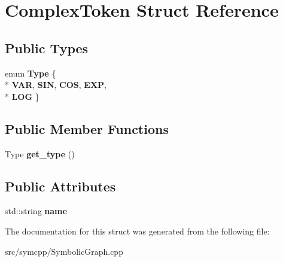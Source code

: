 \hypertarget{structComplexToken}{}\section{Complex\+Token Struct Reference}
\label{structComplexToken}
\subsection*{Public Types}
\begin{DoxyCompactItemize}
\item 
enum {\bfseries Type} \{ \\*
{\bfseries V\+AR}, 
{\bfseries S\+IN}, 
{\bfseries C\+OS}, 
{\bfseries E\+XP}, 
\\*
{\bfseries L\+OG}
 \}\hypertarget{structComplexToken_a62ef03cb17dd287467fb37ff78ac8c6c}{}\label{structComplexToken_a62ef03cb17dd287467fb37ff78ac8c6c}

\end{DoxyCompactItemize}
\subsection*{Public Member Functions}
\begin{DoxyCompactItemize}
\item 
Type {\bfseries get\+\_\+type} ()\hypertarget{structComplexToken_aedf9869c464ceaede0874b2d6e79653e}{}\label{structComplexToken_aedf9869c464ceaede0874b2d6e79653e}

\end{DoxyCompactItemize}
\subsection*{Public Attributes}
\begin{DoxyCompactItemize}
\item 
std\+::string {\bfseries name}\hypertarget{structComplexToken_afaa117b0be95e038b1dfc0013019f934}{}\label{structComplexToken_afaa117b0be95e038b1dfc0013019f934}

\end{DoxyCompactItemize}


The documentation for this struct was generated from the following file\+:\begin{DoxyCompactItemize}
\item 
src/symcpp/Symbolic\+Graph.\+cpp\end{DoxyCompactItemize}
